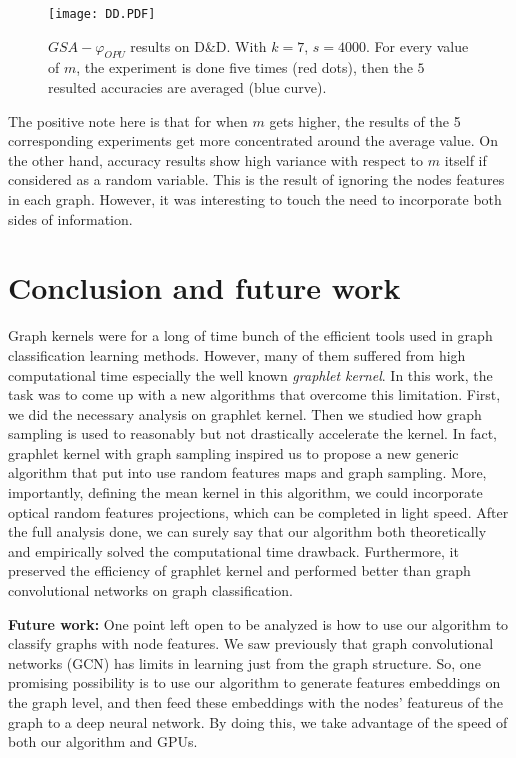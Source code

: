 \begin{figure}[H]
\centering
\texttt{[image: DD.PDF]}
\caption[$GSA-\varphi_{OPU}$ results on D\&D dataset]{$GSA-\varphi_{OPU}$ results on D\&D. With  $k=7$, $s=4000$. For every value of $m$, the experiment is done five times (red dots), then the $5$ resulted accuracies are averaged (blue curve).}
\label{fig:DD}
\end{figure}
The positive note here is that for when $m$ gets higher, the results of the 5 corresponding experiments get more concentrated around the average value. On the other hand, accuracy results show high variance with respect to $m$ itself if considered as a random variable. This is the result of ignoring the nodes features in each graph. However, it was interesting to touch the need to incorporate both sides of information.

\section{Conclusion and future work}
Graph kernels were for a long of time bunch of the efficient tools used in graph classification learning methods. However, many of them suffered from high computational time especially the well known \emph{graphlet kernel}. In this work, the task was to come up with a new algorithms that overcome this limitation. First, we did the necessary analysis on graphlet kernel. Then we studied how graph sampling is used to reasonably but not drastically accelerate the kernel. In fact, graphlet kernel with graph sampling inspired us to propose a new generic algorithm that put into use random features maps and graph sampling. More, importantly, defining the mean kernel in this algorithm, we could incorporate optical random features projections, which can be completed in light speed. After the full analysis done, we can surely say that our algorithm  both theoretically and empirically solved the computational time drawback. Furthermore, it preserved the efficiency of graphlet kernel and performed better than graph convolutional networks on graph classification.

\textbf{Future work:} One point left open to be analyzed is how to use our algorithm to classify graphs with node features. We saw previously that graph convolutional networks (GCN) has limits in learning just from the graph structure. So, one promising possibility is to use our algorithm to generate features embeddings on the graph level, and then feed these embeddings with the nodes' featureus of the graph to a deep neural network. By doing this, we take advantage of the speed of both our algorithm and GPUs. 



